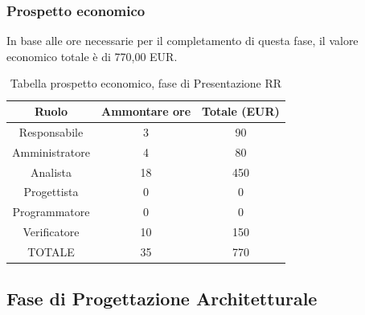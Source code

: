 \subsubsection{Prospetto economico}
In base alle ore necessarie per il completamento di questa fase, il valore economico totale è di 770,00 EUR.
\begin{table}[h]
\caption{Tabella prospetto economico, fase di Presentazione RR}  
\begin{center}
\begin{tabular}{ |c|c|c|  }
 \hline
 Ruolo 		& Ammontare ore 	& Totale (EUR)\\
 	\hline
 \hline
 	Responsabile	& 3 		& 90\\
	Amministratore	& 4		& 80\\
	Analista		& 18 	& 450\\
	Progettista		& 0		& 0\\
	Programmatore	& 0		& 0\\
	Verificatore	& 10		& 150\\
 \hline\hline
 TOTALE		& 35		& 770\\
  \hline
\end{tabular}
\end{center}
\end{table}
\newpage
\subsection{Fase di Progettazione Architetturale}

